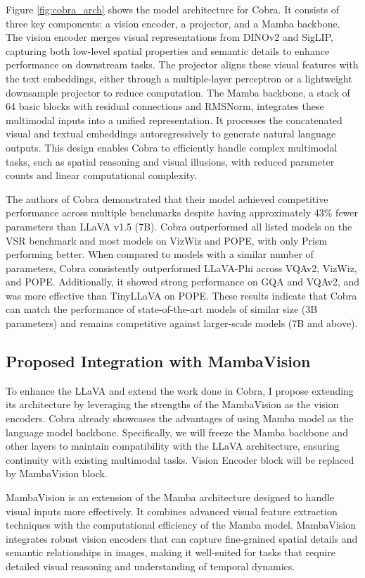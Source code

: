 \documentclass[12pt, conference, compsoc, onecolumn]{IEEEtran}
\begin{document}
	Figure \ref{fig:cobra_arch} shows the model architecture for Cobra. It consists of three key components: a vision encoder, a projector, and a Mamba backbone. The vision encoder merges visual representations from DINOv2 and SigLIP, capturing both low-level spatial properties and semantic details to enhance performance on downstream tasks. The projector aligns these visual features with the text embeddings, either through a multiple-layer perceptron or a lightweight downsample projector to reduce computation. The Mamba backbone, a stack of 64 basic blocks with residual connections and RMSNorm, integrates these multimodal inputs into a unified representation. It processes the concatenated visual and textual embeddings autoregressively to generate natural language outputs. This design enables Cobra to efficiently handle complex multimodal tasks, such as spatial reasoning and visual illusions, with reduced parameter counts and linear computational complexity.
	
	The authors of Cobra demonstrated that their model achieved competitive performance across multiple benchmarks despite having approximately 43\% fewer parameters than LLaVA v1.5 (7B). Cobra outperformed all listed models on the VSR benchmark and most models on VizWiz and POPE, with only Prism performing better. When compared to models with a similar number of parameters, Cobra consistently outperformed LLaVA-Phi across VQAv2, VizWiz, and POPE. Additionally, it showed strong performance on GQA and VQAv2, and was more effective than TinyLLaVA on POPE. These results indicate that Cobra can match the performance of state-of-the-art models of similar size (3B parameters) and remains competitive against larger-scale models (7B and above).
	
	\subsection{Proposed Integration with MambaVision}
	
	To enhance the LLaVA and extend the work done in Cobra, I propose extending its architecture by leveraging the strengths of the MambaVision as the vision encoders. Cobra already showcases the advantages of using Mamba model as the language model backbone. Specifically, we will freeze the Mamba backbone and other layers to maintain compatibility with the LLaVA architecture, ensuring continuity with existing multimodal tasks. Vision Encoder block will be replaced by MambaVision block.
	
	MambaVision is an extension of the Mamba architecture designed to handle visual inputs more effectively. It combines advanced visual feature extraction techniques with the computational efficiency of the Mamba model. MambaVision integrates robust vision encoders that can capture fine-grained spatial details and semantic relationships in images, making it well-suited for tasks that require detailed visual reasoning and understanding of temporal dynamics. 
	
\end{document}
